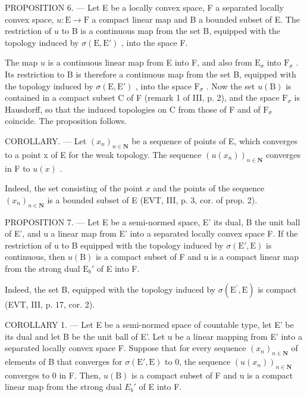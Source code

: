 PROPOSITION 6. --- Let E be a locally convex space, F a separated locally convex space, \(u: \mathrm{E} \to \mathrm{F}\) a compact linear map and B a bounded subset of E. The restriction of \(u\) to B is a continuous map from the set B, equipped with the topology induced by \(\sigma(\mathrm{E}, \mathrm{E}')\) , into the space F.

The map \(u\) is a continuous linear map from E into F, and also from \(\mathrm{E}_{\sigma}\) into \(\mathrm{F}_{\sigma}\) . Its restriction to B is therefore a continuous map from the set B, equipped with the topology induced by \(\sigma(\mathrm{E}, \mathrm{E}')\) , into the space \(\mathrm{F}_{\sigma}\) . Now the set \(u(\mathrm{B})\) is contained in a compact subset C of F (remark 1 of III, p. 2), and the space \(\mathrm{F}_{\sigma}\) is Hausdorff, so that the induced topologies on C from those of F and of \(\mathrm{F}_{\sigma}\) coincide. The proposition follows.

COROLLARY. --- Let \((x_{n})_{n\in\mathbf{N}}\) be a sequence of points of E, which converges to a point x of E for the weak topology. The sequence \((u(x_{n}))_{n\in\mathbf{N}}\) converges in F to \(u(x)\) .

Indeed, the set consisting of the point \(x\) and the points of the sequence \((x_{n})_{n\in \mathbf{N}}\) is a bounded subset of E (EVT, III, p. 3, cor. of prop. 2).

PROPOSITION 7. --- Let E be a semi-normed space, E' its dual, B the unit ball of E', and u a linear map from E' into a separated locally convex space F. If the restriction of u to B equipped with the topology induced by \(\sigma(\mathrm{E}',\mathrm{E})\) is continuous, then \(u(\mathrm{B})\) is a compact subset of F and u is a compact linear map from the strong dual \(\mathrm{E}_b'\) of E into F.

Indeed, the set B, equipped with the topology induced by \(\sigma(\mathrm{E}^{\prime},\mathrm{E})\) is compact (EVT, III, p. 17, cor. 2).

COROLLARY 1. --- Let E be a semi-normed space of countable type, let E' be its dual and let B be the unit ball of E'. Let u be a linear mapping from E' into a separated locally convex space F. Suppose that for every sequence \((x_{n})_{n\in\mathbf{N}}\) of elements of B that converges for \(\sigma(\mathrm{E}',\mathrm{E})\) to 0, the sequence \((u(x_{n}))_{n\in\mathbf{N}}\) converges to 0 in F. Then, \(u(\mathrm{B})\) is a compact subset of F and u is a compact linear map from the strong dual \(E_{b}'\) of E into F.


